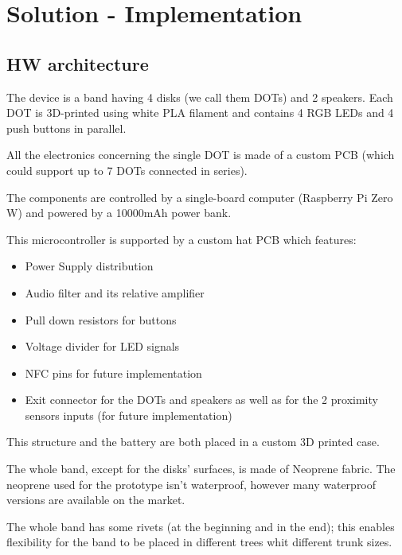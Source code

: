 \documentclass[a4paper,11pt]{report}
\begin{document}
\chapter{Solution - Implementation}
\section{HW architecture}
The device is a band having 4 disks (we call them DOTs) and 2 speakers. Each DOT is 3D-printed using white PLA filament and contains 4 RGB LEDs and 4 push buttons in parallel.\par
All the electronics concerning the single DOT is made of a custom PCB (which could support up to 7 DOTs connected in series).\par
The components are controlled by a single-board computer (Raspberry Pi Zero W) and powered by a 10000mAh power bank.\par
This microcontroller is supported by a custom hat PCB which features:
\begin{itemize}
    \item Power Supply distribution
    \item Audio filter and its relative amplifier
    \item Pull down resistors for buttons
    \item Voltage divider for LED signals
    \item NFC pins for future implementation
    \item Exit connector for the DOTs and speakers as well as for the 2 proximity sensors inputs (for future implementation)
\end{itemize}
This structure and the battery are both placed in a custom 3D printed case.\par
The whole band, except for the disks’ surfaces, is made of Neoprene fabric. The neoprene used for the prototype isn’t waterproof, however many waterproof versions are available on the market.\par
The whole band has some rivets (at the beginning and in the end); this enables flexibility for the band to be placed in different trees whit different trunk sizes.
\end{document}
